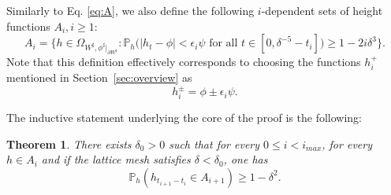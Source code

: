 \documentclass[10pt]{amsart}
\newtheorem{theo}{Theorem}[section]
\theoremstyle{definition}\newtheorem{defi}[theo]{Definition}\newtheorem{rema}[theo]{Remark}\newtheorem{exam}[theo]{Example}\newtheorem{exem}[theo]{Example}\newtheorem{nota}[theo]{Notation}
\renewcommand{\P}{\mathbb{P}}
\renewcommand{\d}{{\sharp }}
\begin{document}
Similarly to Eq. \eqref{eq:A}, we also define the following $i$-dependent sets of height functions $A_i, i\ge1$:
\begin{equation}\label{eq:Ai}
A_i=\Big\{h\in \Omega_{W^\d,\phi^\d|_{\partial W^\d}}:\P_h\Big(|h_t-\phi|<\epsilon_i\psi \text{ for all }t\in [0,\delta^{-5}-t_i]\Big)\geq 1 -2i\delta^3 \Big\}.
\end{equation}
Note that this definition effectively corresponds to choosing the functions $h^+_i$ mentioned in Section~\ref{sec:overview} as
\begin{equation}\label{eq:hhpsi}
h_i^\pm=\phi\pm\epsilon_i \psi.
\end{equation}


The inductive statement underlying the core of the proof is the following:

\begin{theo}\label{th:core}
There exists $\delta_0>0 $ such that for every $0 \leq i < i_{max}$, for every $h \in A_i$ and if the lattice mesh satisfies $\delta<\delta_0$, one has
\begin{equation}\label{eq:core}
\P_h(h_{t_{i+1} - t_{i}} \in A_{i+1}) \geq 1 - \delta^2.
\end{equation}
\end{theo}
\end{document}

